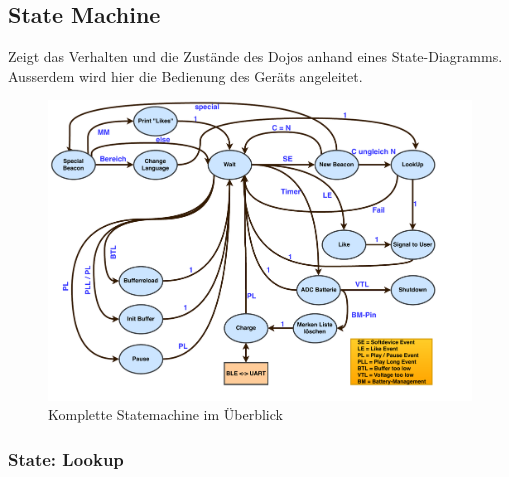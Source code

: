 \subsection{State Machine}\label{sec:stateMachine}

Zeigt das Verhalten und die Zustände des Dojos anhand eines State-Diagramms. Ausserdem wird hier die Bedienung des Geräts angeleitet.

\begin{figure}[htbp]
	\centering
	\includegraphics[width=1.15\textwidth]{Data/StateMachineFinal.pdf}
	\caption[Statemachine-Diagramm]{Komplette Statemachine im Überblick}
	\label{fig:completeStateMachine}
\end{figure} 

\subsubsection*{State: Lookup}

